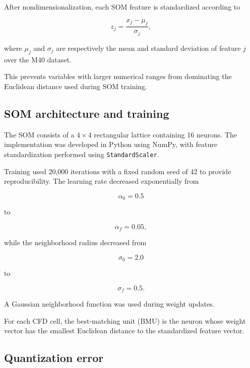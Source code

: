 After nondimensionalization, each SOM feature is standardized according to

\begin{equation}
z_j =
\frac{x_j-\mu_j}{\sigma_j},
\end{equation}

where \(\mu_j\) and \(\sigma_j\) are respectively the mean and standard
deviation of feature \(j\) over the M40 dataset.

This prevents variables with larger numerical ranges from dominating the
Euclidean distance used during SOM training.

\subsection{SOM architecture and training}

The SOM consists of a \(4\times4\) rectangular lattice containing 16 neurons.
The implementation was developed in Python using NumPy, with feature
standardization performed using \texttt{StandardScaler}.

Training used 20,000 iterations with a fixed random seed of 42 to provide
reproducibility. The learning rate decreased exponentially from

\begin{equation}
\alpha_0=0.5
\end{equation}

to

\begin{equation}
\alpha_f=0.05,
\end{equation}

while the neighborhood radius decreased from

\begin{equation}
\sigma_0=2.0
\end{equation}

to

\begin{equation}
\sigma_f=0.5.
\end{equation}

A Gaussian neighborhood function was used during weight updates.

For each CFD cell, the best-matching unit (BMU) is the neuron whose weight
vector has the smallest Euclidean distance to the standardized feature
vector.

\subsection{Quantization error}

